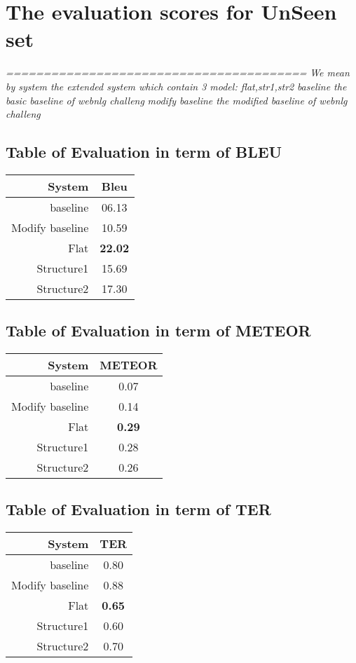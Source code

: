 \documentclass{article}%
\begin{document}
%
\normalsize%
\section{The evaluation scores for UnSeen set}%
\textit{========================================\newline%
}%
\textit{We mean by system the extended system which contain 3 model: flat,str1,str2\newline%
}%
\textit{baseline the basic baseline of webnlg challeng \newline%
}%
\textit{modify baseline the modified baseline of webnlg challeng \newline%
}%
\subsection{Table of Evaluation in term of BLEU \newline%
}%
\begin{tabular}{|r|c|}%
\hline%
\textbf{System}&\textbf{Bleu}\\%
\hline%
baseline&06.13\\%
\hline%
Modify baseline&10.59\\%
\hline%
Flat&\textbf{22.02}\\%
\hline%
Structure1&15.69\\%
\hline%
Structure2&17.30\\%
\hline%
\end{tabular}

%
\subsection{Table of Evaluation in term of METEOR \newline%
}%
\begin{tabular}{|r|c|}%
\hline%
\textbf{System}&\textbf{METEOR}\\%
\hline%
baseline&0.07\\%
\hline%
Modify baseline&0.14\\%
\hline%
Flat&\textbf{0.29}\\%
\hline%
Structure1&0.28\\%
\hline%
Structure2&0.26\\%
\hline%
\end{tabular}

%
\subsection{Table of Evaluation in term of TER \newline%
}%
\begin{tabular}{|r|c|}%
\hline%
\textbf{System}&\textbf{TER}\\%
\hline%
baseline&0.80\\%
\hline%
Modify baseline&0.88\\%
\hline%
Flat&\textbf{0.65}\\%
\hline%
Structure1&0.60\\%
\hline%
Structure2&0.70\\%
\hline%
\end{tabular}

%
\end{document}
